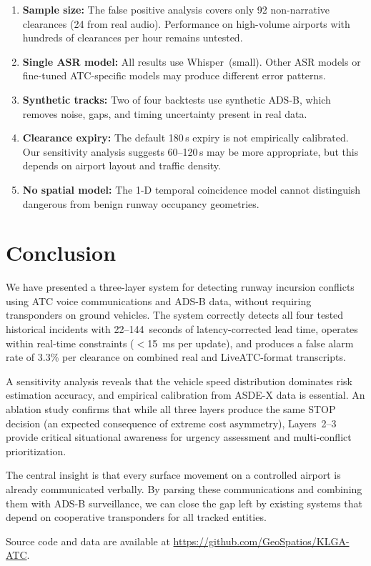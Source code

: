 \documentclass[11pt,a4paper]{article}
\begin{document}
\begin{enumerate}[nosep]
    \item \textbf{Sample size:} The false positive analysis covers only 92 non-narrative clearances (24 from real audio). Performance on high-volume airports with hundreds of clearances per hour remains untested.
    \item \textbf{Single ASR model:} All results use Whisper~(small). Other ASR models or fine-tuned ATC-specific models may produce different error patterns.
    \item \textbf{Synthetic tracks:} Two of four backtests use synthetic ADS-B, which removes noise, gaps, and timing uncertainty present in real data.
    \item \textbf{Clearance expiry:} The default 180\,s expiry is not empirically calibrated. Our sensitivity analysis suggests 60--120\,s may be more appropriate, but this depends on airport layout and traffic density.
    \item \textbf{No spatial model:} The 1-D temporal coincidence model cannot distinguish dangerous from benign runway occupancy geometries.
\end{enumerate}

\section{Conclusion}
\label{sec:conclusion}

We have presented a three-layer system for detecting runway incursion conflicts using ATC voice communications and ADS-B data, without requiring transponders on ground vehicles.
The system correctly detects all four tested historical incidents with 22--144~seconds of latency-corrected lead time, operates within real-time constraints ($<$15~ms per update), and produces a false alarm rate of 3.3\% per clearance on combined real and LiveATC-format transcripts.

A sensitivity analysis reveals that the vehicle speed distribution dominates risk estimation accuracy, and empirical calibration from ASDE-X data is essential.
An ablation study confirms that while all three layers produce the same STOP decision (an expected consequence of extreme cost asymmetry), Layers~2--3 provide critical situational awareness for urgency assessment and multi-conflict prioritization.

The central insight is that every surface movement on a controlled airport is already communicated verbally.
By parsing these communications and combining them with ADS-B surveillance, we can close the gap left by existing systems that depend on cooperative transponders for all tracked entities.

Source code and data are available at \url{https://github.com/GeoSpatios/KLGA-ATC}.




\end{document}
